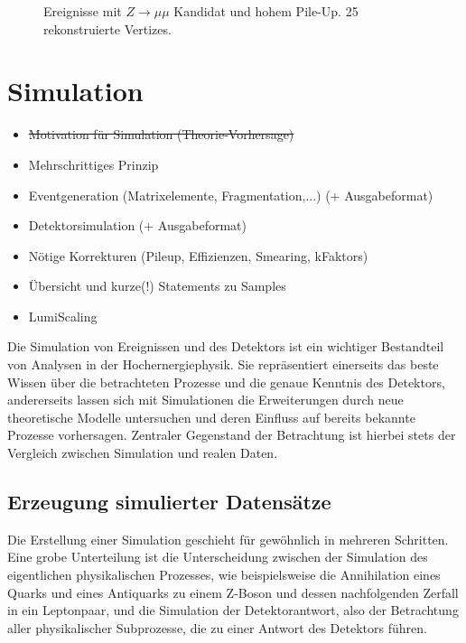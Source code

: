 \begin{figure}
\begin{minipage}[b]{0.48\textwidth}
        \captionsetup{format=plain}
        \caption{Ereignisse mit $Z \rightarrow \mu\mu$ Kandidat und hohem
            Pile-Up. 25 rekonstruierte Vertizes.}
        \label{fig:pileup}
    \end{minipage}
\end{figure}



\section{Simulation}
\label{data_sim_selection:simulation}

\begin{itemize}
    \item \sout{Motivation für Simulation (Theorie-Vorhersage)}
    \item Mehrschrittiges Prinzip
    \item Eventgeneration (Matrixelemente, Fragmentation,...) (+ Ausgabeformat)
    \item Detektorsimulation (+ Ausgabeformat)
    \item Nötige Korrekturen (Pileup, Effizienzen, Smearing, kFaktors)
    \item Übersicht und kurze(!) Statements zu Samples
    \item LumiScaling
\end{itemize}

Die Simulation von Ereignissen und des Detektors ist ein wichtiger Bestandteil
von Analysen in der Hochernergiephysik. Sie repräsentiert einerseits das
beste Wissen über die betrachteten Prozesse und die genaue Kenntnis des
Detektors, andererseits lassen sich mit Simulationen die Erweiterungen durch
neue theoretische Modelle untersuchen und deren Einfluss auf bereits bekannte
Prozesse vorhersagen. Zentraler Gegenstand der Betrachtung ist hierbei stets
der Vergleich zwischen Simulation und realen Daten.



\subsection{Erzeugung simulierter Datensätze}
\label{event_generation}
Die Erstellung einer Simulation geschieht für gewöhnlich in mehreren Schritten.
Eine grobe Unterteilung ist die Unterscheidung zwischen der Simulation des
eigentlichen physikalischen Prozesses, wie beispielsweise die Annihilation
eines Quarks und eines Antiquarks zu einem Z-Boson und dessen nachfolgenden
Zerfall in ein Leptonpaar, und die Simulation der Detektorantwort, also der
Betrachtung aller physikalischer Subprozesse, die zu einer Antwort des
Detektors führen.

